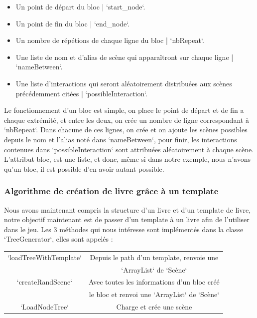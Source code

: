 \documentclass[12pt]{article}
\begin{document}
\begin{itemize}
    \item Un point de départ du bloc | `start\_node`.
    \item Un point de fin du bloc | `end\_node`.
    \item Un nombre de répétions de chaque ligne du bloc | `nbRepeat`.
    \item Une liste de nom et d'alias de scène qui apparaîtront sur chaque ligne | `nameBetween`.
    \item Une liste d'interactions qui seront aléatoirement distribuées aux scènes précédemment citées | `possibleInteraction`.\\
\end{itemize}

Le fonctionnement d'un bloc est simple, on place le point de départ et de fin a chaque extrémité, et entre les deux, on crée un nombre de ligne correspondant à `nbRepeat`. Dans chacune de ces lignes, on crée et on ajoute les scènes possibles depuis le nom et l'alias noté dans `nameBetween`, pour finir, les interactions contenues dans `possibleInteraction` sont attribuées aléatoirement à chaque scène.\\

L'attribut bloc, est une liste, et donc, même si dans notre exemple, nous n'avons qu'un bloc, il est possible d'en avoir autant possible.

\subsubsection{Algorithme de création de livre grâce à un template}
Nous avons maintenant compris la structure d'un livre et d'un template de livre, notre objectif maintenant est de passer d'un template à un livre afin de l'utiliser dans le jeu. Les 3 méthodes qui nous intéresse sont implémentés dans la classe `TreeGenerator`, elles sont appelés :

\begin{center}
\begin{tabular}{ c c }

`loadTreeWithTemplate` & Depuis le path d'un template, renvoie une\\
&`ArrayList` de `Scène`\\
`createRandScene` & Avec toutes les informations d'un bloc créé \\
& le bloc et renvoi une `ArrayList` de `Scène`\\
`LoadNodeTree` & Charge et crée une scène
\end{tabular}
\end{center}
\end{document}
